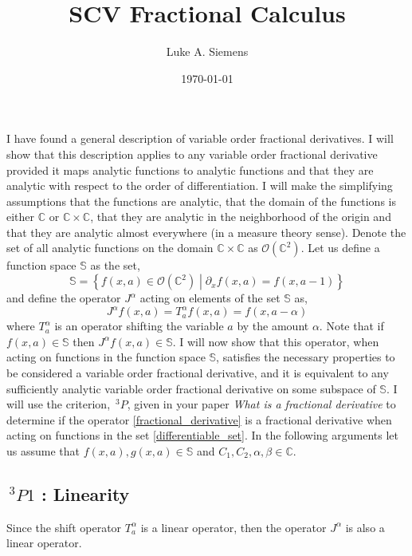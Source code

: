 \documentclass[%
 onecolumn,
 amsmath, amssymb, aps, pra, 10pt
]{revtex4-2}
\begin{document}
\title{SCV Fractional Calculus}%
\author{Luke A. Siemens}
\noaffiliation
\date{\today}
\maketitle

I have found a general description of variable order fractional derivatives. I will show that this description applies to any variable order fractional derivative provided it maps analytic functions to analytic functions and that they are analytic with respect to the order of differentiation. I will make the simplifying assumptions that the functions are analytic, that the domain of the functions is either $\mathbb{C}$ or $\mathbb{C} \times \mathbb{C}$, that they are analytic in the neighborhood of the origin and that they are analytic almost everywhere (in a measure theory sense). Denote the set of all analytic functions on the domain $\mathbb{C} \times \mathbb{C}$ as $\mathcal{O}(\mathbb{C}^2)$. Let us define a function space $\mathbb{S}$ as the set,
\begin{equation}
\mathbb{S} = \left\lbrace f(x, a) \in \mathcal{O}(\mathbb{C}^2) \middle| \partial_x f(x, a) = f(x, a - 1) \right\rbrace
\label{differentiable_set}
\end{equation}
and define the operator $J^{\alpha}$ acting on elements of the set $\mathbb{S}$ as,
\begin{equation}
J^{\alpha} f(x, a) = T_{a}^{\alpha} f(x, a) = f(x, a - \alpha)
\label{fractional_derivative}
\end{equation}
where $T_{a}^{\alpha}$ is an operator shifting the variable $a$ by the amount $\alpha$. Note that if $f(x, a) \in \mathbb{S}$ then $J^{\alpha} f(x, a) \in \mathbb{S}$. I will now show that this operator, when acting on functions in the function space $\mathbb{S}$, satisfies the necessary properties to be considered a variable order fractional derivative, and it is equivalent to any sufficiently analytic variable order fractional derivative on some subspace of $\mathbb{S}$.
I will use the criterion, $\,^3P$, given in your paper \textit{What is a fractional derivative} \cite{ORTIGUEIRA20154} to determine if the operator \eqref{fractional_derivative} is a fractional derivative when acting on functions in the set \eqref{differentiable_set}. In the following arguments let us assume that $f(x, a), g(x, a) \in \mathbb{S}$ and $C_1, C_2, \alpha, \beta \in \mathbb{C}$.

\subsection*{$\,^3P1$ : Linearity}
Since the shift operator $T_{a}^{\alpha}$ is a linear operator, then the operator $J^{\alpha}$ is also a linear operator.
\end{document}
